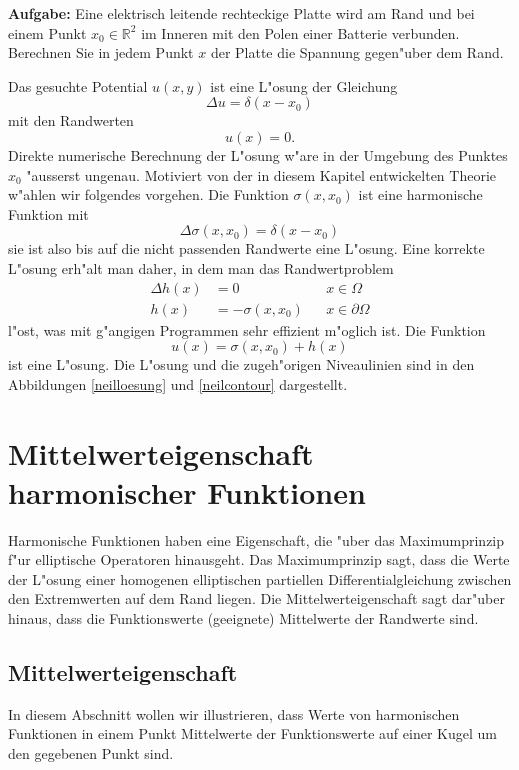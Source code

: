 {\parindent 0pt
\medskip
{\bf Aufgabe:} Eine elektrisch leitende rechteckige Platte wird am Rand und bei 
einem Punkt $x_0\in\mathbb R^2$ im Inneren mit den Polen einer Batterie verbunden. Berechnen
Sie in jedem Punkt $x$ der Platte die Spannung gegen"uber dem Rand.

\medskip
}
Das gesuchte Potential $u(x,y)$ ist eine L"osung der Gleichung
\[
\Delta u=\delta(x-x_0)
\]
mit den Randwerten
\[
u(x)=0.
\]
Direkte numerische Berechnung der L"osung w"are in der Umgebung des Punktes
$x_0$ "ausserst ungenau. Motiviert von der in diesem Kapitel entwickelten
Theorie w"ahlen wir folgendes vorgehen. Die Funktion $\sigma(x,x_0)$
ist eine harmonische Funktion mit 
\[
\Delta\sigma(x,x_0)=\delta(x-x_0)
\]
sie ist also bis auf die nicht passenden Randwerte eine L"osung.
Eine korrekte L"osung erh"alt man daher, in dem man das Randwertproblem
\begin{align*}
\Delta h(x)&=0&&x\in\Omega\\
h(x)&=-\sigma(x,x_0)&&x\in\partial\Omega
\end{align*}
l"ost, was mit g"angigen Programmen sehr effizient m"oglich ist.
Die Funktion 
\[
u(x)=\sigma(x,x_0)+h(x)
\]
ist eine L"osung. Die L"osung und die zugeh"origen Niveaulinien
sind in den Abbildungen \ref{neilloesung} und \ref{neilcontour} dargestellt.

\section{Mittelwerteigenschaft harmonischer Funktionen}
Harmonische Funktionen haben eine Eigenschaft, die "uber das Maximumprinzip
f"ur elliptische Operatoren hinausgeht.
Das Maximumprinzip sagt, dass die Werte der L"osung einer homogenen
elliptischen partiellen Differentialgleichung zwischen den
Extremwerten auf dem Rand liegen.
Die Mittelwerteigenschaft sagt dar"uber hinaus, dass die Funktionswerte
(geeignete) Mittelwerte der Randwerte sind.

\subsection{Mittelwerteigenschaft}
In diesem Abschnitt wollen wir illustrieren, dass
Werte von harmonischen Funktionen in einem Punkt
Mittelwerte der Funktionswerte auf einer Kugel um den gegebenen Punkt sind.

